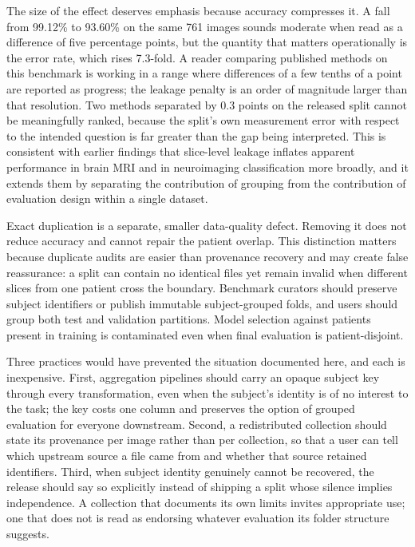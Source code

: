 ﻿\documentclass[twocolumn]{article}
\begin{document}
The size of the effect deserves emphasis because accuracy compresses it. A fall from 99.12\% to 93.60\% on the same 761 images sounds moderate when read as a difference of five percentage points, but the quantity that matters operationally is the error rate, which rises 7.3-fold. A reader comparing published methods on this benchmark is working in a range where differences of a few tenths of a point are reported as progress; the leakage penalty is an order of magnitude larger than that resolution. Two methods separated by 0.3 points on the released split cannot be meaningfully ranked, because the split's own measurement error with respect to the intended question is far greater than the gap being interpreted. This is consistent with earlier findings that slice-level leakage inflates apparent performance in brain MRI and in neuroimaging classification more broadly\cite{yagis2021effect,wen2020convolutional}, and it extends them by separating the contribution of grouping from the contribution of evaluation design within a single dataset.

Exact duplication is a separate, smaller data-quality defect. Removing it does not reduce accuracy and cannot repair the patient overlap. This distinction matters because duplicate audits are easier than provenance recovery and may create false reassurance: a split can contain no identical files yet remain invalid when different slices from one patient cross the boundary. Benchmark curators should preserve subject identifiers or publish immutable subject-grouped folds, and users should group both test and validation partitions. Model selection against patients present in training is contaminated even when final evaluation is patient-disjoint.

Three practices would have prevented the situation documented here, and each is inexpensive. First, aggregation pipelines should carry an opaque subject key through every transformation, even when the subject's identity is of no interest to the task; the key costs one column and preserves the option of grouped evaluation for everyone downstream. Second, a redistributed collection should state its provenance per image rather than per collection, so that a user can tell which upstream source a file came from and whether that source retained identifiers. Third, when subject identity genuinely cannot be recovered, the release should say so explicitly instead of shipping a split whose silence implies independence. A collection that documents its own limits invites appropriate use; one that does not is read as endorsing whatever evaluation its folder structure suggests.
\end{document}
